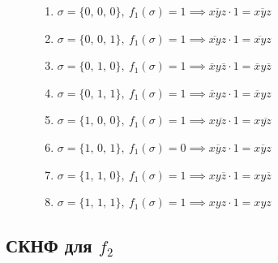 \documentclass[12pt,a4paper]{article}
\theoremstyle{plain}
\theoremstyle{definition}
\theoremstyle{remark}
\numberwithin{equation}{section}
\begin{document}
\begin{figure}[H]
\begin{minipage}[t]{0.55\textwidth}
  \end{minipage} \hfill 
  \begin{minipage}[t]{0.5\textwidth}
    \vspace{0em}
    \begin{enumerate}
      \item $\sigma = \{0,\,0,\,0\},\ f_1(\sigma) = 1 \implies \overline{xyz} \cdot 1 = \overline{xyz}$
      \item $\sigma = \{0,\,0,\,1\},\ f_1(\sigma) = 1 \implies \overline{xy}z \cdot 1 = \overline{xy}z$
      \item $\sigma = \{0,\,1,\,0\},\ f_1(\sigma) = 1 \implies \overline{x}y\overline{z} \cdot 1 = \overline{x}y\overline{z}$
      \item $\sigma = \{0,\,1,\,1\},\ f_1(\sigma) = 1 \implies \overline{x}yz \cdot 1 = \overline{x}yz$
      \item $\sigma = \{1,\,0,\,0\},\ f_1(\sigma) = 1 \implies x\overline{yz} \cdot 1 = x\overline{yz}$
      \item $\sigma = \{1,\,0,\,1\},\ f_1(\sigma) = 0 \implies x\overline{y}z \cdot 1 = x\overline{y}z$
      \item $\sigma = \{1,\,1,\,0\},\ f_1(\sigma) = 1 \implies xy\overline{z} \cdot 1 = xy\overline{z}$
      \item $\sigma = \{1,\,1,\,1\},\ f_1(\sigma) = 1 \implies xyz \cdot 1 = xyz$
    \end{enumerate}
  \end{minipage}
\end{figure}

\subsection{СКНФ для $f_2$}
\end{document}
